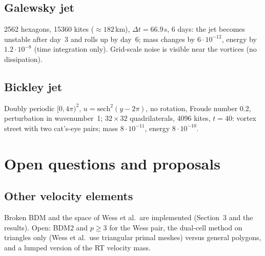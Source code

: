 \documentclass[11pt,a4paper]{article}
\begin{document}
\subsection{Galewsky jet}
2562 hexagons, 15360 kites ($\approx 182$\,km), $\Delta t = 66.9$\,s, 6 days:
the jet becomes unstable after day~3 and rolls up by day~6; mass changes by
$6\cdot10^{-12}$, energy by $1.2\cdot10^{-8}$ (time integration only). Grid-scale
noise is visible near the vortices (no dissipation).

\subsection{Bickley jet}
Doubly periodic $[0,4\pi)^2$, $u = \mathrm{sech}^2(y-2\pi)$, no rotation, Froude
number 0.2, perturbation in wavenumber~1; $32\times32$ quadrilaterals, 4096 kites,
$t = 40$: vortex street with two cat's-eye pairs; mass $8\cdot10^{-11}$, energy
$8\cdot10^{-10}$.

\section{Open questions and proposals}

\subsection{Other velocity elements}
Broken BDM and the space of Wess et al.\ are implemented (Section~3 and the
results). Open: BDM2 and $p\ge3$ for the Wess pair, the dual-cell method on
triangles only (Wess et al.\ use triangular primal meshes) versus general
polygons, and a lumped version of the RT velocity mass.
\end{document}
